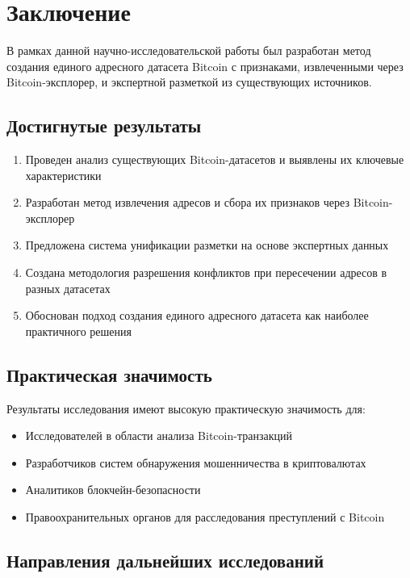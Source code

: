 \section{Заключение}

В рамках данной научно-исследовательской работы был разработан метод создания единого адресного датасета Bitcoin с признаками, извлеченными через Bitcoin-эксплорер, и экспертной разметкой из существующих источников.

\subsection{Достигнутые результаты}

\begin{enumerate}
    \item Проведен анализ существующих Bitcoin-датасетов и выявлены их ключевые характеристики
    \item Разработан метод извлечения адресов и сбора их признаков через Bitcoin-эксплорер
    \item Предложена система унификации разметки на основе экспертных данных
    \item Создана методология разрешения конфликтов при пересечении адресов в разных датасетах
    \item Обоснован подход создания единого адресного датасета как наиболее практичного решения
\end{enumerate}

\subsection{Практическая значимость}

Результаты исследования имеют высокую практическую значимость для:

\begin{itemize}
    \item Исследователей в области анализа Bitcoin-транзакций
    \item Разработчиков систем обнаружения мошенничества в криптовалютах
    \item Аналитиков блокчейн-безопасности
    \item Правоохранительных органов для расследования преступлений с Bitcoin
\end{itemize}

\subsection{Направления дальнейших исследований}

